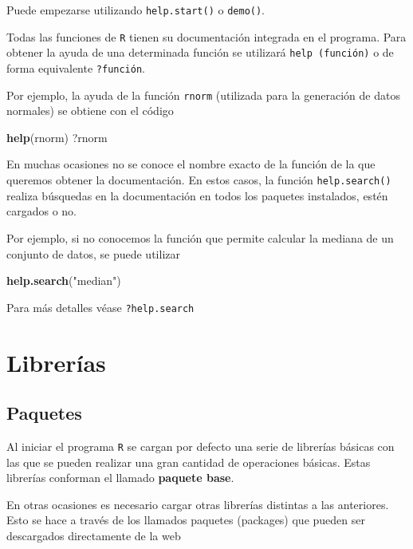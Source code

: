 \documentclass[]{book}
\newenvironment{Shaded}{\begin{snugshade}}{\end{snugshade}}
\newcommand{\KeywordTok}[1]{\textcolor[rgb]{0.13,0.29,0.53}{\textbf{#1}}}
\newcommand{\NormalTok}[1]{#1}
\newcommand{\StringTok}[1]{\textcolor[rgb]{0.31,0.60,0.02}{#1}}
\begin{document}
Puede empezarse utilizando \texttt{help.start()} o \texttt{demo()}.

Todas las funciones de \texttt{R} tienen su documentación integrada en
el programa. Para obtener la ayuda de una determinada función se
utilizará \texttt{help\ (función)} o de forma equivalente \texttt{?función}.

Por ejemplo, la ayuda de la función \texttt{rnorm} (utilizada para la
generación de datos normales) se obtiene con el código

\begin{Shaded}
\begin{Highlighting}[]
\KeywordTok{help}\NormalTok{(rnorm)}
\NormalTok{?rnorm}
\end{Highlighting}
\end{Shaded}

En muchas ocasiones no se conoce el nombre exacto de la función de la
que queremos obtener la documentación. En estos casos, la función
\texttt{help.search()} realiza búsquedas en la documentación en todos los
paquetes instalados, estén cargados o no.

Por ejemplo, si no conocemos la función que permite calcular la mediana
de un conjunto de datos, se puede utilizar

\begin{Shaded}
\begin{Highlighting}[]
\KeywordTok{help.search}\NormalTok{(}\StringTok{"median"}\NormalTok{)}
\end{Highlighting}
\end{Shaded}

Para más detalles véase \texttt{?help.search}

\hypertarget{librerias}{%
\section{Librerías}\label{librerias}}

\hypertarget{paquetes}{%
\subsection{Paquetes}\label{paquetes}}

Al iniciar el programa \texttt{R} se cargan
por defecto una serie de librerías básicas con las que se pueden
realizar una gran cantidad de operaciones básicas. Estas librerías
conforman el llamado \textbf{paquete base}.

En otras ocasiones es necesario cargar otras librerías distintas a las
anteriores. Esto se hace a través de los llamados paquetes (packages)
que pueden ser descargados directamente de la web
\end{document}
